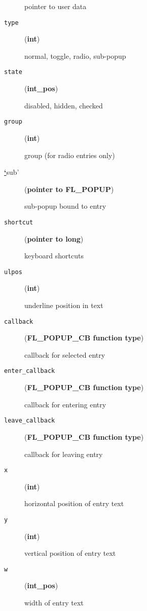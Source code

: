 \begin{description}
pointer to user data

\item[{\texttt{type}}] \leavevmode (\textbf{int})

normal, toggle, radio, sub-popup

\item[{\texttt{state}}] \leavevmode (\textbf{int\_pos})

disabled, hidden, checked

\item[{\texttt{group}}] \leavevmode (\textbf{int})

group (for radio entries only)

\item[{%
\raisebox{1em}{\hypertarget{id4}{}}\hyperlink{id3}{\textbf{\color{red}`}}sub'}] \leavevmode (\textbf{pointer to FL\_POPUP})

sub-popup bound to entry

\item[{\texttt{shortcut}}] \leavevmode (\textbf{pointer to long})

keyboard shortcuts

\item[{\texttt{ulpos}}] \leavevmode (\textbf{int})

underline position in text

\item[{\texttt{callback}}] \leavevmode (\textbf{FL\_POPUP\_CB function type})

callback for selected entry

\item[{\texttt{enter\_callback}}] \leavevmode (\textbf{FL\_POPUP\_CB function type})

callback for entering entry

\item[{\texttt{leave\_callback}}] \leavevmode (\textbf{FL\_POPUP\_CB function type})

callback for leaving entry

\item[{\texttt{x}}] \leavevmode (\textbf{int})

horizontal position of entry text

\item[{\texttt{y}}] \leavevmode (\textbf{int})

vertical position of entry text

\item[{\texttt{w}}] \leavevmode (\textbf{int\_pos})

width of entry text


\end{description}
